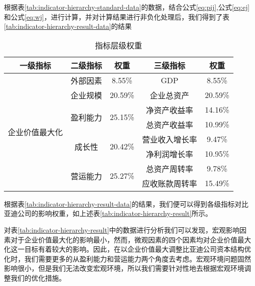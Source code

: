 根据表\eqref{tab:indicator-hierarchy-standard-data}的数据，结合公式\eqref{eq:pij},公式\eqref{eq:ej}和公式\eqref{eq:wj}，进行计算，并对计算结果进行非负化处理后，我们得到了表\eqref{tab:indicator-hierarchy-result-data}的结果
\begin{table}
  \centering
  \begin{threeparttable}[c]
    \caption{指标层级权重}
    \label{tab:indicator-hierarchy-result}
    \begin{tabular}{ccccc}
      \toprule
        一级指标 & 二级指标 & 权重 & 三级指标 & 权重 \\ 
      \midrule
        \multirow{9}{*}{企业价值最大化} & 外部因素 &8.55\% & GDP  & 8.55\% \\ 
        & 企业规模 & 20.59\% & 企业总资产& 20.59\% \\
        & \multirow{2}{*}{盈利能力}&\multirow{2}{*}{25.15\%} & 净资产收益率 &14.16\% \\ 
        &                         &  & 总资产收益率 & 10.99\% \\ 
        & \multirow{2}{*}{成长性} &\multirow{2}{*}{20.42\%}&营业收入增长率&9.47\% \\ 
        &                         &   & 净利润增长率& 10.95\% \\ 
        & \multirow{2}{*}{营运能力}&\multirow{2}{*}{25.27\%}& 总资产周转率& 9.78\% \\
        &                         &    & 应收账款周转率& 15.49\% \\ 
      \bottomrule
    \end{tabular}
  \end{threeparttable}
\end{table}

根据表\eqref{tab:indicator-hierarchy-result-data}的结果，我们便可以得到各级指标对比亚迪公司的影响权重，如上述表\eqref{tab:indicator-hierarchy-result}所示。

对表\eqref{tab:indicator-hierarchy-result}中的数据进行分析我们可以发现，宏观影响因素对于企业价值最大化的影响最小，然而，微观因素的四个因素均对企业价值最大化这一目标有着较大的影响。因此，在以企业价值最大调整比亚迪公司资本结构优化时，我们需要更多的从盈利能力和营运能力两个角度去考虑。宏观环境问题固然影响很小，但是我们无法改变宏观环境，所以我们需要针对性地去根据宏观环境调整我们的优化措施。 
